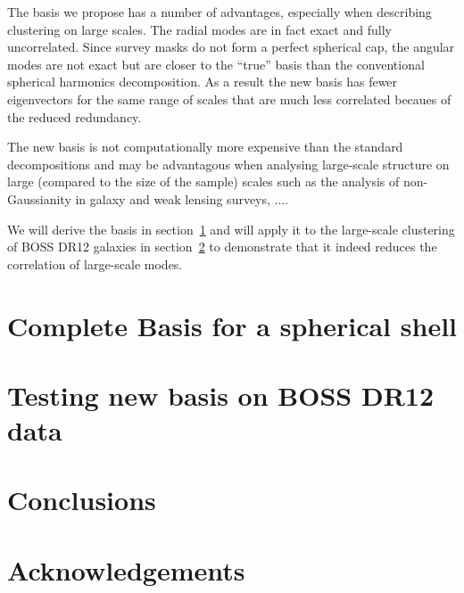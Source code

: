 \documentclass[fleqn,usenatbib]{mnras}
\begin{document}
The basis we propose has a number of advantages, especially when describing
clustering on large scales. The radial modes are in fact exact and fully
uncorrelated. Since survey masks do not form a perfect spherical cap, the angular
modes are not exact but are closer to the ``true'' basis than the conventional
spherical harmonics decomposition. As a result the new basis has fewer
eigenvectors for the same range of scales that are much less correlated becaues of
the reduced redundancy.

The new basis is not computationally more expensive than the standard
decompositions and may be advantagous when analysing large-scale structure on
large (compared to the size of the sample) scales such as the analysis of
non-Gaussianity in galaxy and weak lensing surveys, $\ldots$.

We will derive the basis in section~\ref{sec:basis} and will apply it to the
large-scale clustering of BOSS DR12 galaxies in section~\ref{sec:data} to
demonstrate that it indeed reduces the correlation of large-scale modes.

\section{Complete Basis for a spherical shell}
\label{sec:basis}

\section{Testing new basis on BOSS DR12 data}
\label{sec:data}

\section{Conclusions}
\label{sec:conclusions}

\section*{Acknowledgements}




%


\begin{thebibliography}{99}
\end{thebibliography}



\appendix



\bsp	%
\label{lastpage}
\end{document}
